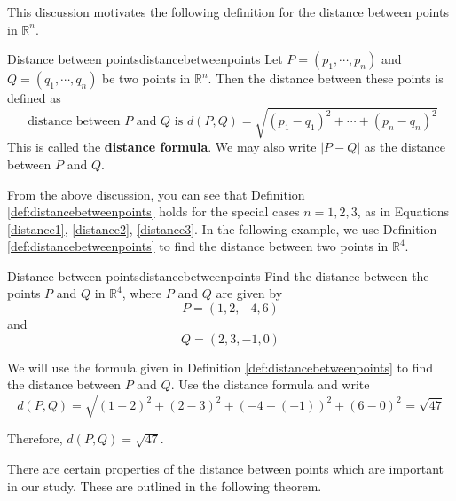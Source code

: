 This discussion motivates the following definition for the distance between points in $\mathbb{R}^n$. 

\begin{definition}{Distance between points}{distancebetweenpoints}
Let $P=\left( p_{1},\cdots ,p_{n}\right) $ and 
$Q=\left( q_{1},\cdots ,q_{n}\right) $ be two points in 
$\mathbb{R}^{n}$. Then the distance
between these points is defined as
\begin{equation*}
\text{ distance between }P\text{ and } Q\text{ is } 
d( P, Q ) =\sqrt{ (p_1-q_1)^2 + \cdots + (p_n-q_n)^2}
\end{equation*}
This is called the \textbf{distance formula}. We may also write $\left\vert P - Q \right\vert $ as the distance between $P$ and $Q$.
\end{definition}

From the above discussion, you can see that Definition \ref{def:distancebetweenpoints} holds for the special cases $n=1,2,3$, as in 
Equations \ref{distance1}, \ref{distance2}, \ref{distance3}. 
In the following example, we use Definition \ref{def:distancebetweenpoints} to find the distance between two points in
$\mathbb{R}^4$.

\begin{example}{Distance between points}{distancebetweenpoints}
Find the distance between the points $P$ and $Q$ in $\mathbb{R}^{4}$,
where $P$ and $Q$ are given by 
\begin{equation*}
P=\left( 1,2,-4,6\right)
\end{equation*}
and
\begin{equation*}
Q=\left( 2,3,-1,0\right)
\end{equation*}
\end{example}

\begin{solution}
We will use the formula given in Definition \ref{def:distancebetweenpoints} to find the distance between
$P$ and $Q$. 
Use the distance formula and write
\begin{equation*}
d(P,Q)= \sqrt{ \left( 1-2\right) ^{2}+\left( 2-3\right)
^{2}+\left( -4-\left( -1\right) \right) ^{2}+\left( 6-0\right)^{2}} = \sqrt{47}
\end{equation*}

Therefore, $d( P,Q) =
\sqrt{47}.$

\end{solution}

There are certain properties of the distance between points which are important in our study.
These are outlined in the following theorem.

